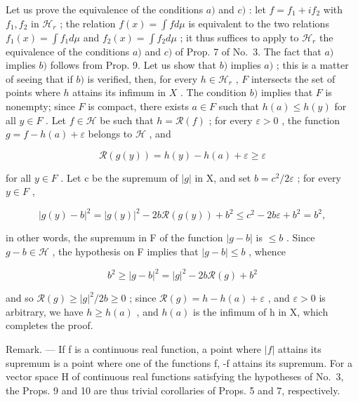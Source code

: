 Let us prove the equivalence of the conditions \(a)\) and \(c)\) : let \(f = f_{1} + if_{2}\) with \(f_{1}, f_{2}\) in \(\mathcal{H}_{r}\) ; the relation \(f(x) = \int f d\mu\) is equivalent to the two relations \(f_{1}(x) = \int f_{1} d\mu\) and \(f_{2}(x) = \int f_{2} d\mu\) ; it thus suffices to apply to \(\mathcal{H}_{r}\) the equivalence of the conditions \(a)\) and \(c)\) of Prop. 7 of No.~3. The fact that \(a)\) implies \(b)\) follows from Prop. 9. Let us show that \(b)\) implies \(a)\) ; this is a matter of seeing that if \(b)\) is verified, then, for every \(h \in \mathcal{H}_{r}\) , \(F\) intersects the set of points where \(h\) attains its infimum in \(X\) . The condition \(b)\) implies that \(F\) is nonempty; since \(F\) is compact, there exists \(a \in F\) such that \(h(a) \leqslant h(y)\) for all \(y \in F\) . Let \(f \in \mathcal{H}\) be such that \(h = \mathcal{R}(f)\) ; for every \(\varepsilon > 0\) , the function \(g = f - h(a) + \varepsilon\) belongs to \(\mathcal{H}\) , and

\[
\mathcal {R} (g (y)) = h (y) - h (a) + \varepsilon \geqslant \varepsilon
\]

for all \(y \in F\) . Let c be the supremum of \(|g|\) in X, and set \(b = c^{2}/2\varepsilon\) ; for every \(y \in F\) ,

\[
\left| g (y) - b \right| ^ {2} = \left| g (y) \right| ^ {2} - 2 b \mathcal {R} (g (y)) + b ^ {2} \leqslant c ^ {2} - 2 b \varepsilon + b ^ {2} = b ^ {2},
\]

in other words, the supremum in F of the function \(|g - b|\) is \(\leqslant b\) . Since \(g - b \in \mathcal{H}\) , the hypothesis on F implies that \(|g - b| \leqslant b\) , whence

\[
b ^ {2} \geqslant | g - b | ^ {2} = | g | ^ {2} - 2 b \mathcal {R} (g) + b ^ {2}
\]

and so \(\mathcal{R}(g) \geqslant |g|^{2}/2b \geqslant 0\) ; since \(\mathcal{R}(g) = h - h(a) + \varepsilon\) , and \(\varepsilon > 0\) is arbitrary, we have \(h \geqslant h(a)\) , and \(h(a)\) is the infimum of h in X, which completes the proof.

Remark. --- If f is a continuous real function, a point where \(|f|\) attains its supremum is a point where one of the functions f, -f attains its supremum. For a vector space H of continuous real functions satisfying the hypotheses of No.~3, the Props. 9 and 10 are thus trivial corollaries of Props. 5 and 7, respectively.

